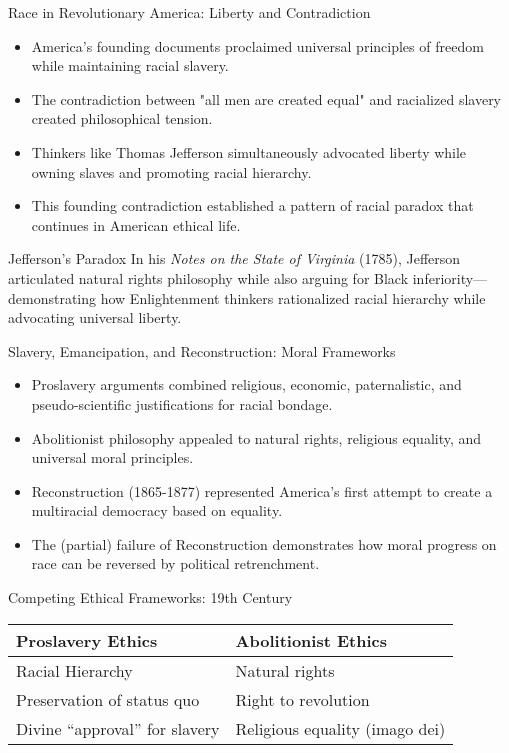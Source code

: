 \documentclass{beamer}
\begin{document}
	\begin{frame}{Race in Revolutionary America: Liberty and Contradiction}
		\begin{itemize}
			\item America's founding documents proclaimed universal principles of freedom while maintaining racial slavery.
			\item The contradiction between "all men are created equal" and racialized slavery created philosophical tension.
			\item Thinkers like Thomas Jefferson simultaneously advocated liberty while owning slaves and promoting racial hierarchy.
			\item This founding contradiction established a pattern of racial paradox that continues in American ethical life.
		\end{itemize}
		
		\begin{exampleblock}{Jefferson's Paradox}
			In his \textit{Notes on the State of Virginia} (1785), Jefferson articulated natural rights philosophy while also arguing for Black inferiority—demonstrating how Enlightenment thinkers rationalized racial hierarchy while advocating universal liberty.
		\end{exampleblock}
	\end{frame}
	
	\begin{frame}{Slavery, Emancipation, and Reconstruction: Moral Frameworks}
		\begin{itemize}
			\item Proslavery arguments combined religious, economic, paternalistic, and pseudo-scientific justifications for racial bondage.
			\item Abolitionist philosophy appealed to natural rights, religious equality, and universal moral principles.
			\item Reconstruction (1865-1877) represented America's first attempt to create a multiracial democracy based on equality.
			\item The (partial) failure of Reconstruction demonstrates how moral progress on race can be reversed by political retrenchment.
		\end{itemize}
		
		\begin{alertblock}{Competing Ethical Frameworks: 19th Century}
			\begin{tabular}{|l|l|}
				\hline
				\textbf{Proslavery Ethics} & \textbf{Abolitionist Ethics} \\
				\hline
				Racial Hierarchy & Natural rights \\
				Preservation of status quo & Right to revolution\\
				Divine ``approval'' for slavery & Religious equality (imago dei) \\
				\hline
			\end{tabular}
		\end{alertblock}
	\end{frame}
	
\end{document}

